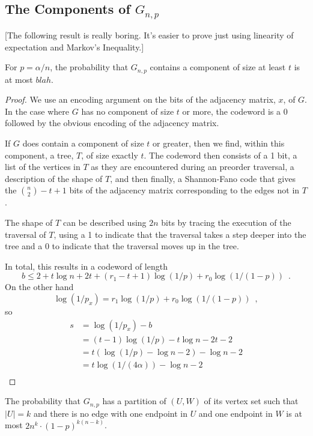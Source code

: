 \documentclass{patmorin}
\begin{document}
\subsection{The Components of $G_{n,p}$}

[The following result is really boring. It's easier to prove just using linearity of expectation and Markov's Inequality.]

\begin{thm}
  For $p=\alpha/n$, the probability that $G_{n,p}$ contains a component of size at least $t$ is at most $blah$.
\end{thm}

\begin{proof}
  We use an encoding argument on the bits of the adjacency matrix, $x$,
  of $G$.  In the case where $G$ has no component of size $t$ or more,
  the codeword is a 0 followed by the obvious encoding of the adjacency
  matrix.

  If $G$ does contain a component of size $t$ or greater, then we
  find, within this component, a tree, $T$, of size exactly $t$.
  The codeword then consists of a 1 bit, a list of the vertices in $T$
  as they are encountered during an preorder traversal, a description
  of the shape of $T$, and then finally, a Shannon-Fano code that gives
  the $\binom{n}{2}-t+1$ bits of the adjacency matrix corresponding to
  the edges not in $T$.

  The shape of $T$ can be described using $2n$ bits by tracing the
  execution of the traversal of $T$, using a 1 to indicate that the
  traversal takes a step deeper into the tree and a 0 to indicate that
  the traversal moves up in the tree.

  In total, this results in a codeword of length
  \[   
    b \le 2 + t\log n + 2t + (r_1-t+1)\log(1/p) + r_0\log(1/(1-p))  \enspace . 
  \]
  On the other hand
  \[   
     \log (1/p_x) = r_1\log(1/p) + r_0\log(1/(1-p)) \enspace ,
  \]
  so
  \begin{align*}
     s & = \log(1/p_x) - b \\
       & =  (t-1)\log(1/p) - t\log n - 2t - 2 \\
       & = t(\log(1/p)-\log n - 2) - \log n - 2 \\
       & = t\log(1/(4\alpha)) - \log n - 2 \\
  \end{align*}
\end{proof}



\begin{lem}
  The probability that $G_{n,p}$ has a partition of $(U,W)$ of its vertex
  set such that $|U|=k$ and there is no edge with one endpoint in $U$
  and one endpoint in $W$ is at most $2n^k\cdot (1-p)^{k(n-k)}$.
\end{lem}
\end{document}
